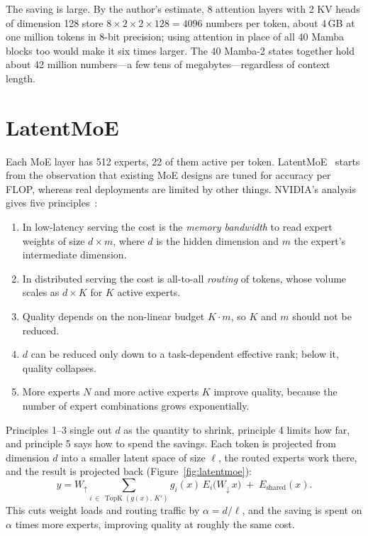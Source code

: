 The saving is large. By the author's estimate, 8 attention layers with 2 KV
heads of dimension 128 store $8 \times 2 \times 2 \times 128 = 4096$ numbers
per token, about 4\,GB at one million tokens in 8-bit precision; using
attention in place of all 40 Mamba blocks too would make it six times larger.
The 40 Mamba-2 states together hold about 42 million numbers---a few tens of
megabytes---regardless of context length.

\section{LatentMoE}

Each MoE layer has 512 experts, 22 of them active per token. LatentMoE~\cite{elango2026latentmoe}
starts from the observation that existing MoE designs are tuned for accuracy
per FLOP, whereas real deployments are limited by other things. NVIDIA's
analysis gives five principles~\cite{nvidia2026super}:
\begin{enumerate}
  \item In low-latency serving the cost is the \emph{memory bandwidth} to read
        expert weights of size $d \times m$, where $d$ is the hidden dimension
        and $m$ the expert's intermediate dimension.
  \item In distributed serving the cost is all-to-all \emph{routing} of tokens,
        whose volume scales as $d \times K$ for $K$ active experts.
  \item Quality depends on the non-linear budget $K \cdot m$, so $K$ and $m$
        should not be reduced.
  \item $d$ can be reduced only down to a task-dependent effective rank;
        below it, quality collapses.
  \item More experts $N$ and more active experts $K$ improve quality, because
        the number of expert combinations grows exponentially.
\end{enumerate}
Principles 1--3 single out $d$ as the quantity to shrink, principle 4 limits
how far, and principle 5 says how to spend the savings. Each token is projected from dimension $d$
into a smaller latent space of size $\ell$, the routed experts work there, and
the result is projected back (Figure~\ref{fig:latentmoe}):
\begin{equation}
  y = W_{\uparrow} \sum_{i \,\in\, \operatorname{TopK}(g(x),\,K')}
      g_i(x)\, E_i\bigl(W_{\downarrow}\,x\bigr) \;+\; E_{\text{shared}}(x).
  \label{eq:latentmoe}
\end{equation}
This cuts weight loads and routing traffic by $\alpha = d/\ell$, and the
saving is spent on $\alpha$ times more experts, improving quality at roughly
the same cost.

